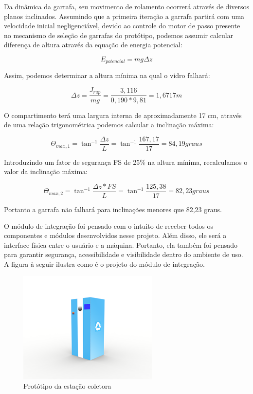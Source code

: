 Da dinâmica da garrafa, seu movimento de rolamento ocorrerá através de diversos planos inclinados. Assumindo que a primeira iteração a garrafa partirá com uma velocidade inicial negligenciável, devido ao controle do motor de passo presente no mecanismo de seleção de garrafas do protótipo, podemos assumir calcular diferença de altura através da equação de energia potencial:

\begin{equation}
    E_{potencial} = mg\Delta z
\end{equation}

Assim, podemos determinar a altura mínima na qual o vidro falhará:

\begin{equation}
    \Delta z = \frac{J_{rup}}{mg} = \frac{3,116}{0,190 \ast 9,81} = 1,6717 m
\end{equation}

O compartimento terá uma largura interna de aproximadamente 17 cm, através de uma relação trigonométrica podemos calcular a inclinação máxima:

\begin{equation}
    \Theta _{max,1} = \tan^{-1}\frac{\Delta z}{L} = \tan^{-1}\frac{167,17}{17} = 84,19 graus
\end{equation}

Introduzindo um fator de segurança FS de 25\% na altura mínima, recalculamos o valor da inclinação máxima:

\begin{equation}
    \Theta _{max,2} = \tan^{-1}\frac{\Delta z \ast FS}{L} = \tan^{-1}\frac{125,38}{17} = 82,23 graus
\end{equation}

Portanto a garrafa não falhará para inclinações menores que 82,23 graus.

O módulo de integração foi pensado com o intuito de receber todos os componentes e módulos desenvolvidos nesse projeto. Além disso, ele será a interface física entre o usuário e a máquina. Portanto, ela também foi pensado para garantir segurança, acessibilidade e visibilidade dentro do ambiente de uso. A figura à seguir ilustra como é o projeto do módulo de integração.

\begin{figure}[!h]
	\centering
		\includegraphics[scale=0.4]{figuras/estrutura/28.png}
	\caption{Protótipo da estação coletora}
\end{figure}

